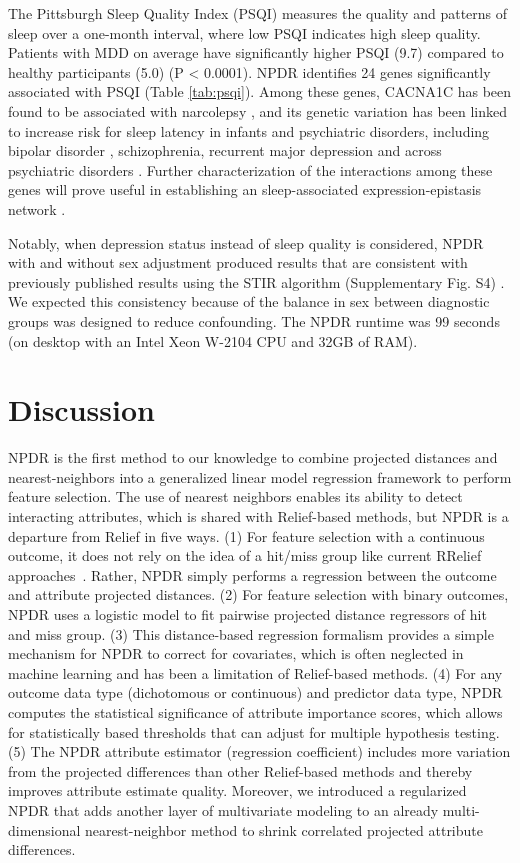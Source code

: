 \documentclass[10pt]{article}
\begin{document}
The Pittsburgh Sleep Quality Index (PSQI) measures the quality and patterns of sleep over a one-month interval, where low PSQI indicates high sleep quality.
Patients with MDD on average have significantly higher PSQI (9.7) compared to healthy participants (5.0) (P < 0.0001).
NPDR identifies 24 genes significantly associated with PSQI (Table \ref{tab:psqi}).
Among these genes, CACNA1C has been found to be associated with narcolepsy \cite{shimada2010}, and its genetic variation has been linked to increase risk for sleep latency in infants \cite{kantojarvi2017} and psychiatric disorders, including bipolar disorder \cite{franke2010}, schizophrenia, recurrent major depression \cite{green2009} and across psychiatric disorders \cite{crossdisorder2013, lotan2014}.
Further characterization of the interactions among these genes will prove useful in establishing an sleep-associated expression-epistasis network \cite{lareau15, mckinney2009capturing}.

Notably, when depression status instead of sleep quality is considered, NPDR with and without sex adjustment produced results that are consistent with previously published results using the STIR algorithm (Supplementary Fig. S4) \cite{stir}.
We expected this consistency because of the balance in sex between diagnostic groups was designed to reduce confounding.
The NPDR runtime was 99 seconds (on desktop with an Intel Xeon W-2104 CPU and 32GB of RAM).


\section{Discussion}
NPDR is the first method to our knowledge to combine projected distances and nearest-neighbors into a generalized linear model regression framework to perform feature selection.
The use of nearest neighbors enables its ability to detect interacting attributes, which is shared with Relief-based methods, but NPDR is a departure from Relief in five ways.
(1) For feature selection with a continuous outcome, it does not rely on the idea of a hit/miss group like current RRelief approaches~\cite{urbanowicz17}.
Rather, NPDR simply performs a regression between the outcome and attribute projected distances.
(2) For feature selection with binary outcomes, NPDR uses a logistic model to fit pairwise projected distance regressors of hit and miss group.
(3) This distance-based regression formalism provides a simple mechanism for NPDR to correct for covariates, which is often neglected in machine learning and has been a limitation of Relief-based methods.
(4) For any outcome data type (dichotomous or continuous) and predictor data type, NPDR computes the statistical significance of attribute importance scores, which allows for statistically based thresholds that can adjust for multiple hypothesis testing.
(5) The NPDR attribute estimator (regression coefficient) includes more variation from the projected differences than other Relief-based methods and thereby improves attribute estimate quality.
Moreover, we introduced a regularized NPDR that adds another layer of multivariate modeling to an already multi-dimensional nearest-neighbor method to shrink correlated projected attribute differences.  
\end{document}
